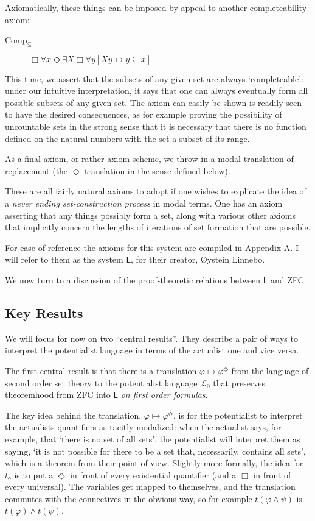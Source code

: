 \documentclass{article}
\begin{document}
Axiomatically, these things can be imposed by appeal to another completeability axiom:
\begin{description}
    \item[Comp$_\subseteq$]
    $\Box \forall x \Diamond \exists X \Box \forall y[ Xy \leftrightarrow y \subseteq x]$
\end{description}
This time, we assert that the subsets of any given set are always `completeable': 
under our intuitive interpretation, 
it says that one can always eventually form all possible subsets of any given set. 
The axiom can easily be shown is readily seen to have the desired consequences, as 
for example proving the possibility of uncountable sets in the strong sense that 
it is necessary that there is no function defined on the natural numbers with the set 
a subset of its range.

As a final axiom, or rather axiom scheme, we throw in a modal 
translation of replacement (the $\Diamond$-translation in the sense defined below).

These are all fairly natural axioms to adopt if one wishes to explicate the idea 
of a \emph{never ending set-construction process} in modal terms. One has an axiom 
asserting that any things possibly form a set, along with various other axioms 
that implicitly concern the lengths of iterations of set formation that are possible.

For ease of reference the axioms 
for this system are compiled in Appendix A. I will refer to them as the system $\mathsf{L}$,
for their creator, \O ystein Linnebo.

We now turn to a discussion of the proof-theoretic relations between $\mathsf{L}$
and ZFC. 
\subsection{Key Results}
We will focus for now on two ``central results''. They describe a pair of ways 
to interpret the potentialist language in terms of the actualist one and vice versa.


The first central result is that there is a translation $\varphi \mapsto \varphi^\Diamond$ 
from the language of second order set theory 
to the potentialist language $\mathcal{L}_0$ that preserves theoremhood 
from ZFC into $\mathsf{L}$ \emph{on first order formulas}. 

The key idea behind the translation, $\varphi \mapsto \varphi^\Diamond$,  
is for the potentialist to interpret the actualists quantifiers as tacitly modalized:
when the actualist says, for example, that `there is no set of all sets', the potentialist 
will interpret them as saying, `it is not possible for there to be a set that, necessarily, contains all sets',
which is a theorem from their point of view. Slightly more formally, 
the idea for $t_\diamond$ is to put a $\Diamond$ in front of every existential quantifier 
(and a $\Box$ in front of 
every universal). The variables get mapped to themselves, and the translation 
commutes with the connectives in the obvious way, so for example $t(\varphi \wedge \psi)$
is $t(\varphi) \wedge t(\psi)$. 
\end{document}

